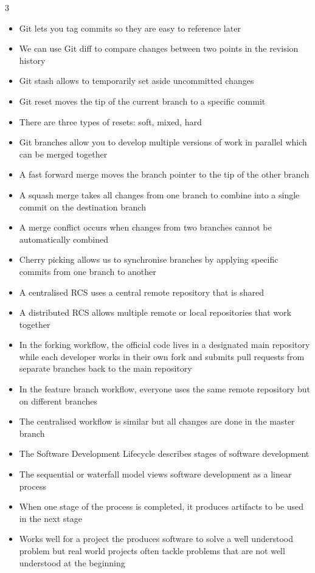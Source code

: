 \documentclass[10pt, landscape]{article}
\begin{document}
\begin{multicols*}{3}
\begin{itemize}
    \item Git lets you tag commits so they are easy to reference later
    \item We can use Git diff to compare changes between two points in the revision history
    \item Git stash allows to temporarily set aside uncommitted changes
    \item Git reset moves the tip of the current branch to a specific commit
    \item There are three types of resets: soft, mixed, hard
    \item Git branches allow you to develop multiple versions of work in parallel which can be merged together
    \item A fast forward merge moves the branch pointer to the tip of the other branch
    \item A squash merge takes all changes from one branch to combine into a single commit on the destination branch
    \item A merge conflict occurs when changes from two branches cannot be automatically combined
    \item Cherry picking allows us to synchronise branches by applying specific commits from one branch to another
    \item A centralised RCS uses a central remote repository that is shared
    \item A distributed RCS allows multiple remote or local repositories that work together
    \item In the forking workflow, the official code lives in a designated main repository while each developer works in their own fork and submits pull requests from separate branches back to the main repository
    \item In the feature branch workflow, everyone uses the same remote repository but on different branches
    \item The centralised workflow is similar but all changes are done in the master branch
    \item The Software Development Lifecycle describes stages of software development
    \item The sequential or waterfall model views software development as a linear process
    \item When one stage of the process is completed, it produces artifacts to be used in the next stage
    \item Works well for a project the produces software to solve a well understood problem but real world projects often tackle problems that are not well understood at the beginning

\end{itemize}
\end{multicols*}
\end{document}
